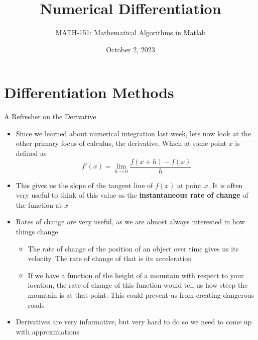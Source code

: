 {}\documentclass[letterpaper,
compress,
xcolor=x11names,
]{beamer}
\begin{document}
	\title{Numerical Differentiation}
	\author{MATH-151:  Mathematical Algorithms in Matlab}
	\date[202X]{October 2, 2023}




\begin{frame}
\titlepage
\end{frame}


\section{Differentiation Methods}

\begin{frame}{A Refresher on the Derivative}
	\footnotesize
	\begin{itemize}
		\item Since we learned about numerical integration last week, lets now look at the other primary focus of calculus, the derivative. Which at some point $x$ is defined as 
		\begin{equation*}
			\displaystyle f'(x) = \lim_{h\rightarrow 0}\frac{f(x+h) - f(x)}{h}
		\end{equation*}
		\item This gives us the slope of the tangent line of $f(x)$ at point $x$. It is often very useful to think of this value as the \textbf{instantaneous rate of change} of the function at $x$
		\item Rates of change are very useful, as we are almost always interested in how things change
		\begin{itemize}
			\item The rate of change of the position of an object over time gives us its velocity. The rate of change of that is its acceleration
			\item If we have a function of the height of a mountain with respect to your location, the rate of change of this function would tell us how steep the mountain is at that point. This could prevent us from creating dangerous roads
		\end{itemize}
		\item Derivatives are very informative, but very hard to do so we need to come up with approximations
	\end{itemize}
\end{frame}
\end{document}
